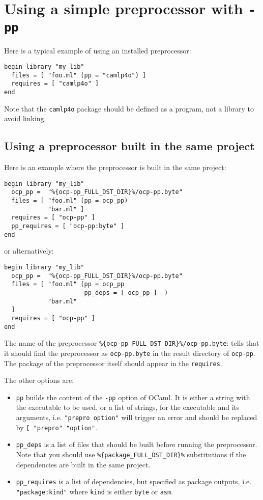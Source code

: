
\section{Using a simple preprocessor with {\tt -pp}}

Here is a typical example of using an installed preprocessor:

\begin{verbatim}
begin library "my_lib"
  files = [ "foo.ml" (pp = "camlp4o") ]
  requires = [ "camlp4o" ]
end
\end{verbatim}

Note that the \verb+camlp4o+ package should be defined as a program,
not a library to avoid linking.

\subsection{Using a preprocessor built in the same project}

Here is an example where the preprocessor is built in the same project:

\begin{verbatim}
begin library "my_lib"
  ocp_pp =  "%{ocp-pp_FULL_DST_DIR}%/ocp-pp.byte"
  files = [ "foo.ml" (pp = ocp_pp)
            "bar.ml" ]
  requires = [ "ocp-pp" ]
  pp_requires = [ "ocp-pp:byte" ]
end
\end{verbatim}

or alternatively:

\begin{verbatim}
begin library "my_lib"
  ocp_pp =  "%{ocp-pp_FULL_DST_DIR}%/ocp-pp.byte"
  files = [ "foo.ml" (pp = ocp_pp
                      pp_deps = [ ocp_pp ]  )
            "bar.ml"
  ]
  requires = [ "ocp-pp" ]
end
\end{verbatim}

The name of the preprocessor \verb|%{ocp-pp_FULL_DST_DIR}%/ocp-pp.byte|:
tells \ocpbuild{} that it should find the preprocessor as \verb|ocp-pp.byte|
in the result directory of \verb|ocp-pp|. The package of the preprocessor
itself should appear in the \verb|requires|.

The other options are:
\begin{itemize}
\item \verb|pp| builds the content of the \verb|-pp| option of OCaml. It
  is either a string with the executable to be used, or a list of strings,
  for the executable and its arguments, i.e. \verb|"prepro option"| will
  trigger an error and should be replaced by \verb|[ "prepro" "option"|.
\item \verb|pp_deps| is a list of files that should be built before running
  the preprocessor. Note that you should use \verb|%{package_FULL_DST_DIR}%|
  substitutions if the dependencies are built in the same project.
\item \verb|pp_requires| is a list of dependencies, but specified as
  package outputs, i.e. \verb|"package:kind"| where \verb|kind| is either
  \verb|byte| or \verb|asm|.
\end{itemize}

